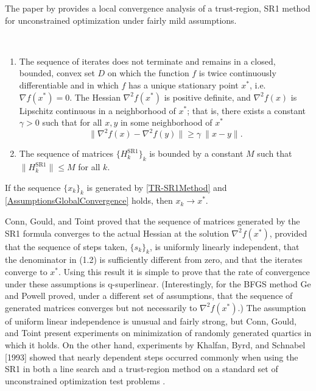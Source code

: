 The paper by \cite{ByrdKhalfanSchnabel:1996} provides a local convergence analysis of a trust-region, SR1 method for unconstrained optimization under fairly mild assumptions. 

\begin{assumption}\label{AssumptionsGlobalConvergence} \ \\[-1.5\baselineskip]
    \begin{enumerate}
        \item The sequence of iterates does not terminate and remains in a closed, bounded, convex set $D$ on which the function $f$ is twice continuously differentiable and in which $f$ has a unique stationary point $x^*$, i.e. $\nabla f(x^*) = 0$. The Hessian $\nabla^2 f(x^*)$ is positive definite, and $\nabla^2 f(x)$ is Lipschitz continuous in a neighborhood of $x^*$; that is, there exists a constant $\gamma > 0$ such that for all $x, y$ in some neighborhood of $x^*$ \begin{equation*} \lVert \nabla^2 f(x) - \nabla^2 f(y) \rVert \geq \gamma \ \lVert x - y \rVert. \end{equation*}
        \item The sequence of matrices $\{ H^{\mathrm{SR1}}_k \}_k$ is bounded by a constant $M$ such that $\lVert H^{\mathrm{SR1}}_k \rVert \leq M$ for all $k$.
    \end{enumerate}
\end{assumption}

\begin{theorem} \label{GlobalConvergence}
    If the sequence $\{ x_k \}_k$ is generated by \cref{TR-SR1Method} and \cref{AssumptionsGlobalConvergence} holds, then $x_k \rightarrow x^*$.
\end{theorem}

Conn, Gould, and Toint proved that the sequence of matrices generated by the SR1 formula converges to the actual Hessian at the solution $\nabla^2 f(x^*)$, provided that the sequence of steps taken, $\{ s_k \}_k$, is uniformly linearly independent, that the denominator in (1.2) is sufficiently different from zero, and that the iterates converge to $x^*$. Using this result it is simple to prove that the rate of convergence under these assumptions is q-superlinear. (Interestingly, for the BFGS method Ge and Powell proved, under a different set of assumptions, that the sequence of generated matrices converges but not necessarily to $\nabla^2 f(x^*)$.) The assumption of uniform linear independence is unusual and fairly strong, but Conn, Gould, and Toint present experiments on minimization of randomly generated quartics in which it holds. On the other hand, experiments by Khalfan, Byrd, and Schnabel [1993] showed that nearly dependent steps occurred commonly when using the SR1 in both a line search and a trust-region method on a standard set of unconstrained optimization test problems \cite[p.~1026]{ByrdKhalfanSchnabel:1996}.


